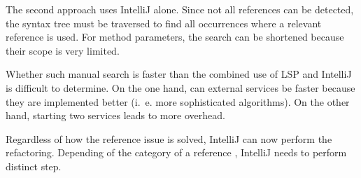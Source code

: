 The second approach uses IntelliJ alone. Since not all references can be detected, the syntax tree must be traversed to find all occurrences where a relevant reference is used. For method parameters, the search can be shortened because their scope is very limited. 

Whether such manual search is faster than the combined use of \ac{LSP} and IntelliJ is difficult to determine. On the one hand, can external services be faster because they are implemented better (i.~e. more sophisticated algorithms). On the other hand, starting two services leads to more overhead. 



Regardless of how the reference issue is solved, IntelliJ can now perform the refactoring. Depending of the category of a reference , IntelliJ needs to perform distinct step. 
